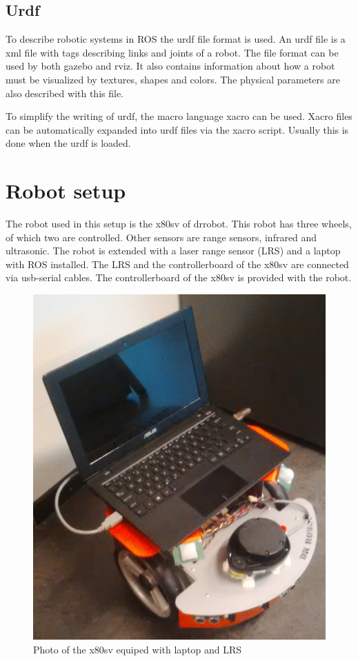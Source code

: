 \documentclass[a4paper]{article}
\begin{document}
\subsection{Urdf}
To describe robotic systems in ROS the urdf file format is used. An urdf file is a xml file
with tags describing links and joints of a robot. The file format can be used by both gazebo
and rviz. It also contains information about how a robot must be visualized by textures, shapes
and colors. The physical parameters are also described with this file.

To simplify the writing of urdf, the macro language xacro can be used. Xacro files can be
automatically expanded into urdf files via the xacro script. Usually this is done when the
urdf is loaded.

\section{Robot setup}
The robot used in this setup is the x80sv of drrobot. This robot has three wheels, of which
two are controlled. Other sensors are range sensors, infrared and ultrasonic.
The robot is extended with a laser range
sensor (LRS) and a laptop with ROS installed. The LRS and the controllerboard of the x80sv are
connected via usb-serial cables. The controllerboard of the x80sv is provided with
the robot.

\begin{figure}[h!]
  \centering
  \includegraphics[width=\textwidth,height=\textheight,keepaspectratio]{img/fotorobot.png}
  \caption{Photo of the x80sv equiped with laptop and LRS}
\end{figure}
\end{document}
